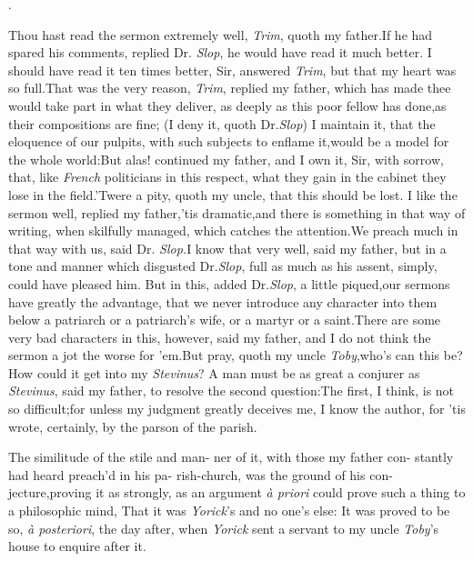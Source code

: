 \documentclass{article}
\begin{document}
\centerline{.}

\bigskip
{}

\newpage
Thou hast read the sermon extremely well, \textit{Trim}, quoth
my father.\tsk If he had spared his comments, replied Dr.\@
\textit{Slop}, he would have read it much better.  I should have
read it ten times better, Sir, answered \textit{Trim}, but that
my heart was so full.\tsk That was the very reason,
\textit{Trim}, replied my father, which has made thee 
would take part in what they deliver, as deeply as
this poor fellow has done,\tsk as their compositions are fine;
(I deny it, quoth Dr.\@ \textit{Slop}) I maintain it,
that the eloquence of our pulpits, with such subjects to enflame
it,\tsk would be a model for the whole world:\tsk But alas!
continued my father, and I own it, Sir, with sorrow, that, like
\textit{French} politicians in this respect, what they gain in
the cabinet they lose in the field.\tsh ’Twere a pity, quoth my
uncle, that this should be lost. I like the sermon well, replied
my father,\tsh ’tis dramatic,\tsk and there is something in
that way of writing, when skilfully managed, which catches the
attention.\tsh We preach much in that way with us, said Dr.\@
\textit{Slop.}\tsk I know that very well, said my father,\tsk
but in a tone and manner which disgusted Dr.\@ \textit{Slop},
full as much as his assent, simply, could have pleased him.\tsh
But in this, added Dr.\@ \textit{Slop}, a little piqued,\tsk our
sermons have greatly the advantage, that we never introduce any
character into them below a patriarch or a patriarch’s wife, or
a martyr or a saint.\tsk There are some very bad characters in
this, however, said my father, and I do not think the sermon a
jot the worse for ’em.\tsh But pray, quoth my uncle
\textit{Toby},\tsk who’s can this 
be?\tsk How could it get into my \textit{Stevinus}? A man must
be as great a conjurer as \textit{Stevinus}, said my father, to
resolve the second question:\tsk The first, I think, is not so
difficult;\tsh for unless my judg\-ment greatly deceives me,\tsh
I know the author, for ’tis wrote, certainly, by the parson of
the parish.

The similitude of the stile and man-\break
ner of it, with those my father con-\break
stantly had heard preach’d in his pa-\break
rish-church, was the ground of his con-\break
jecture,\tsh proving it as strongly, as an argument
\textit{à priori} could prove such a thing to a philosophic
mind, That it was \textit{Yorick}’s and no one’s
else:\tsh\break 
It was proved to be so, \textit{à posteriori},\break
the day after, when \textit{Yorick} sent a servant to my uncle
\textit{Toby}’s house to enquire\break
after it.\\\newpage
\end{document}
